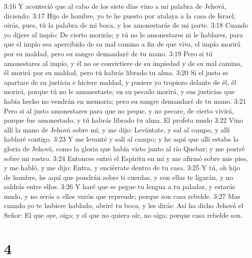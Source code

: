 3:16 Y aconteció que al cabo de los siete días vino a mí palabra de Jehová, diciendo:  
3:17 Hijo de hombre, yo te he puesto por atalaya a la casa de Israel; oirás, pues, tú la palabra de mi boca, y los amonestarás de mi parte.  
3:18 Cuando yo dijere al impío: De cierto morirás; y tú no le amonestares ni le hablares, para que el impío sea apercibido de su mal camino a fin de que viva, el impío morirá por su maldad, pero su sangre demandaré de tu mano.  
3:19 Pero si tú amonestares al impío, y él no se convirtiere de su impiedad y de su mal camino, él morirá por su maldad, pero tú habrás librado tu alma.  
3:20 Si el justo se apartare de su justicia e hiciere maldad, y pusiere yo tropiezo delante de él, él morirá, porque tú no le amonestaste; en su pecado morirá, y sus justicias que había hecho no vendrán en memoria; pero su sangre demandaré de tu mano.  
3:21 Pero si al justo amonestares para que no peque, y no pecare, de cierto vivirá, porque fue amonestado; y tú habrás librado tu alma.  
El profeta mudo  
3:22 Vino allí la mano de Jehová sobre mí, y me dijo: Levántate, y sal al campo, y allí hablaré contigo.  
3:23 Y me levanté y salí al campo; y he aquí que allí estaba la gloria de Jehová, como la gloria que había visto junto al río Quebar; y me postré sobre mi rostro.  
3:24 Entonces entró el Espíritu en mí y me afirmó sobre mis pies, y me habló, y me dijo: Entra, y enciérrate dentro de tu casa.  
3:25 Y tú, oh hijo de hombre, he aquí que pondrán sobre ti cuerdas, y con ellas te ligarán, y no saldrás entre ellos.  
3:26 Y haré que se pegue tu lengua a tu paladar, y estarás mudo, y no serás a ellos varón que reprende; porque son casa rebelde.  
3:27 Mas cuando yo te hubiere hablado, abriré tu boca, y les dirás: Así ha dicho Jehová el Señor: El que oye, oiga; y el que no quiera oír, no oiga; porque casa rebelde son.  

\chapter{4}

